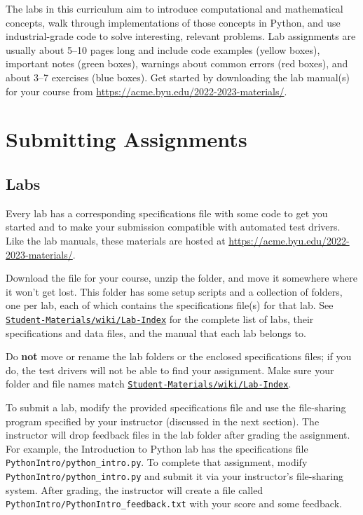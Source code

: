 
The labs in this curriculum aim to introduce computational and mathematical concepts, walk through implementations of those concepts in Python, and use industrial-grade code to solve interesting, relevant problems.
Lab assignments are usually about 5--10 pages long and include code examples (yellow boxes), important notes (green boxes), warnings about common errors (red boxes), and about 3--7 exercises (blue boxes).
Get started by downloading the lab manual(s) for your course from \url{https://acme.byu.edu/2022-2023-materials/}.

\section*{Submitting Assignments} %

\subsection*{Labs}

Every lab has a corresponding specifications file with some code to get you started and to make your submission compatible with automated test drivers.
Like the lab manuals, these materials are hosted at \url{https://acme.byu.edu/2022-2023-materials/}.

Download the  file for your course, unzip the folder, and move it somewhere where it won't get lost.
This folder has some setup scripts and a collection of folders, one per lab, each of which contains the specifications file(s) for that lab.
See \href{https://github.com/Foundations-of-Applied-Mathematics/Student-Materials/wiki/Lab-Index}{\texttt{Student-Materials/wiki/Lab-Index}} for the complete list of labs, their specifications and data files, and the manual that each lab belongs to.

\begin{warn}
Do \textbf{not} move or rename the lab folders or the enclosed specifications files; if you do, the test drivers will not be able to find your assignment.
Make sure your folder and file names match \href{https://github.com/Foundations-of-Applied-Mathematics/Student-Materials/wiki/Lab-Index}{\texttt{Student-Materials/wiki/Lab-Index}}.
\end{warn}

To submit a lab, modify the provided specifications file and use the file-sharing program specified by your instructor (discussed in the next section).
The instructor will drop feedback files in the lab folder after grading the assignment.
For example, the Introduction to Python lab has the specifications file \texttt{PythonIntro/python\_intro.py}.
To complete that assignment, modify \texttt{PythonIntro/python\_intro.py} and submit it via your instructor's file-sharing system.
After grading, the instructor will create a file called \texttt{PythonIntro/PythonIntro\_feedback.txt} with your score and some feedback.

